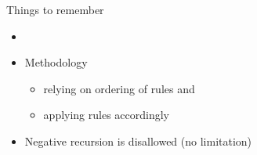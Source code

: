 \begin{frame}{Things to remember}
  \bigskip
  \begin{itemize}
  \item {}
    \medskip
  \item Methodology
    \begin{itemize}\normalsize
    \item relying on ordering of rules and
    \item applying rules accordingly
    \end{itemize}
  \item Negative recursion is disallowed (no limitation)
  \end{itemize}
\end{frame}
%
